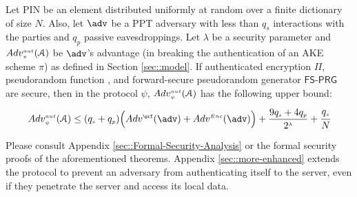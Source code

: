 \begin{theorem} [Authentication]
Let PIN be an element distributed uniformly at random over a finite dictionary of size $N$. Also, 
let $\adv$ be a PPT adversary with less than $q_s$ interactions with the parties and $q_p$ passive eavesdroppings. Let $\lambda$ be a security parameter and $Adv_{\scriptscriptstyle\pi}^{\scriptscriptstyle aut}(\mathcal{A})$ be  $\adv$'s advantage (in breaking the authentication of an AKE scheme $\pi$) as defined in Section \ref{sec::model}.  If authenticated encryption $\Pi$, pseudorandom function \prf,  and forward-secure pseudorandom generator  $\mathsf{FS\text{-}PRG}$ are secure, then in the protocol $\psi$, $Adv_{\scriptscriptstyle \psi}^{\scriptscriptstyle aut}(\mathcal{A})$ has the following upper bound:  
%
\vspace{-3mm}
  \begin{equation*}
 Adv_{\sss \psi}^{\sss aut}(\A)  \leq (q_{\sss s} + q_{\sss p})\Big(Adv^{\sss\prf}(\adv)+Adv^{\sss Enc}(\adv)\Big)+\frac{9q_{\sss s}+4q_{\sss p}}{2^{\sss\lambda}}+  \cfrac{q_{\sss s}}{N}
 \end{equation*}
%
\end{theorem}





Please consult Appendix \ref{sec::Formal-Security-Analysis} or the formal security proofs of the aforementioned theorems. Appendix \ref{sec::more-enhanced} extends the protocol to prevent an adversary from authenticating itself to the server, even if they penetrate the server and access its local data.



